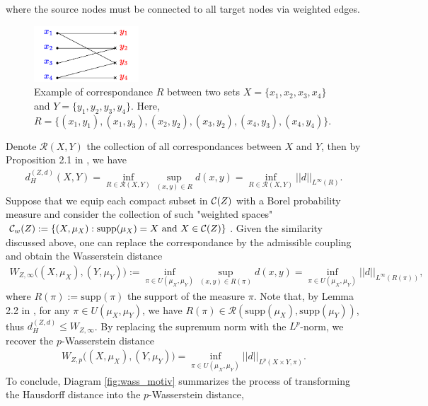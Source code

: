 where the source nodes must be connected to all target nodes via weighted edges.
\begin{figure}[t]
  \centering
  \includegraphics[width=0.35\textwidth,keepaspectratio]{Chapitre1/figures/correspondance.pdf}
  \caption[Example of correspondance]{Example of correspondance $R$ between two sets $X = \{x_1, x_2, x_3, x_4\}$ and
  $Y = \{y_1, y_2, y_3, y_4 \}$. Here,
  $R = \{(x_1, y_1), (x_1, y_3), (x_2, y_2), (x_3, y_2), (x_4, y_3), (x_4, y_4) \}$.}
  \label{fig:correspondance}
\end{figure}
Denote $\mathcal R(X,Y)$ the collection of all correspondances between $X$ and $Y$,
then by Proposition 2.1 in \citep{Memoli11}, we have
\begin{align} \label{haus_corres}
  d_{H}^{(Z, d)}(X,Y) = \inf_{R \in  \mathcal R(X,Y)} \sup_{(x,y) \in R} d(x,y)
  = \inf_{R \in \mathcal R(X,Y)} \vert\vert d \vert\vert_{L^{\infty}(R)}.
\end{align}
Suppose that we equip each compact subset in $\mathcal C(Z)$ with a Borel probability measure and consider
the collection of such "weighted spaces"
$\mathcal C_w(Z) := \{(X,\mu_X): \text{supp}(\mu_X) = X \text{ and } X \in \mathcal C(Z) \}$.
Given the similarity discussed above,
one can replace the correspondance by the admissible coupling and obtain the Wasserstein distance
\begin{align}
  W_{Z, \infty}\big((X,\mu_X), (Y,\mu_Y) \big) :=
  \inf_{\pi \in U(\mu_X, \mu_Y)} \sup_{(x,y) \in R(\pi)} d(x,y)
  = \inf_{\pi \in U(\mu_X, \mu_Y)} \vert\vert d \vert\vert_{L^{\infty}(R(\pi))},
\end{align}
where $R(\pi) := \text{supp}(\pi)$ the support of the measure $\pi$. Note that,
by Lemma 2.2 in \citep{Memoli11}, for any $\pi \in U(\mu_X, \mu_Y)$, we have
$R(\pi) \in  \mathcal R(\text{supp}(\mu_X), \text{supp}(\mu_Y))$, thus
$d_{H}^{(Z, d)} \leq W_{Z, \infty}$. By replacing the supremum norm with the $L^p$-norm,
we recover the $p$-Wasserstein distance
\begin{align}
    W_{Z, p}\big( (X,\mu_X), (Y,\mu_Y) \big)
    = \inf_{\pi \in U(\mu_X, \mu_Y)} \vert\vert d \vert\vert_{L^p(X \times Y, \pi)}.
\end{align}
To conclude, Diagram \ref{fig:wass_motiv} summarizes
the process of transforming the Hausdorff distance into the $p$-Wasserstein distance,
